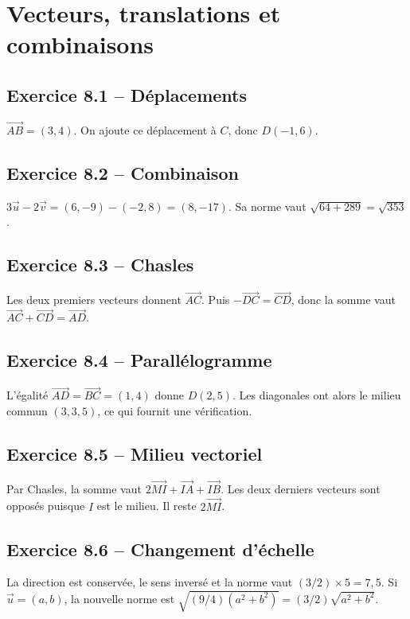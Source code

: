 \chapter{Vecteurs, translations et combinaisons}
\section*{Exercice 8.1 -- Déplacements}
$\overrightarrow{AB}=(3,4)$. On ajoute ce déplacement à $C$, donc $D(-1,6)$.

\section*{Exercice 8.2 -- Combinaison}
$3\vec u-2\vec v=(6,-9)-(-2,8)=(8,-17)$. Sa norme vaut $\sqrt{64+289}=\sqrt{353}$.

\section*{Exercice 8.3 -- Chasles}
Les deux premiers vecteurs donnent $\overrightarrow{AC}$. Puis $-\overrightarrow{DC}=\overrightarrow{CD}$, donc la somme vaut $\overrightarrow{AC}+\overrightarrow{CD}=\overrightarrow{AD}$.

\section*{Exercice 8.4 -- Parallélogramme}
L'égalité $\overrightarrow{AD}=\overrightarrow{BC}=(1,4)$ donne $D(2,5)$. Les diagonales ont alors le milieu commun $(3,3{,}5)$, ce qui fournit une vérification.

\section*{Exercice 8.5 -- Milieu vectoriel}
Par Chasles, la somme vaut $2\overrightarrow{MI}+\overrightarrow{IA}+\overrightarrow{IB}$. Les deux derniers vecteurs sont opposés puisque $I$ est le milieu. Il reste $2\overrightarrow{MI}$.

\section*{Exercice 8.6 -- Changement d'échelle}
La direction est conservée, le sens inversé et la norme vaut $(3/2)\times5=7{,}5$. Si $\vec u=(a,b)$, la nouvelle norme est $\sqrt{(9/4)(a^2+b^2)}=(3/2)\sqrt{a^2+b^2}$.
